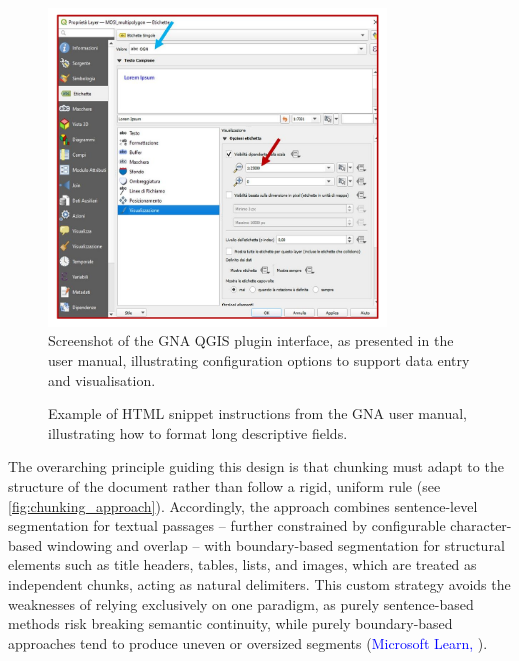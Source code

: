 \begin{spacing}{1.5}
\begin{figure}[H]
  \centering
  \includegraphics[width=0.8\textwidth]{images/esempio_screen.png} 
  \caption{Screenshot of the GNA QGIS plugin interface, as presented in the user manual, illustrating configuration options to support data entry and visualisation.}
  \label{fig:screen_image}
\end{figure}

\begin{figure}[H]
  \centering
  \caption{Example of HTML snippet instructions from the GNA user manual, illustrating how to format long descriptive fields.}
  \label{fig:html_example}
\end{figure}

The overarching principle guiding this design is that chunking must adapt to the structure of the document rather than follow a rigid, uniform rule (see \autoref{fig:chunking_approach}). Accordingly, the approach combines sentence-level segmentation for textual passages -- further constrained by configurable character-based windowing and overlap -- with boundary-based segmentation for structural elements such as title headers, tables, lists, and images, which are treated as independent chunks, acting as natural delimiters. This custom strategy avoids the weaknesses of relying exclusively on one paradigm, as purely sentence-based methods risk breaking semantic continuity, while purely boundary-based approaches tend to produce uneven or oversized segments (\textcolor{blue}{Microsoft Learn,} \citeyear{noauthor_develop_2025}).


\end{spacing}
